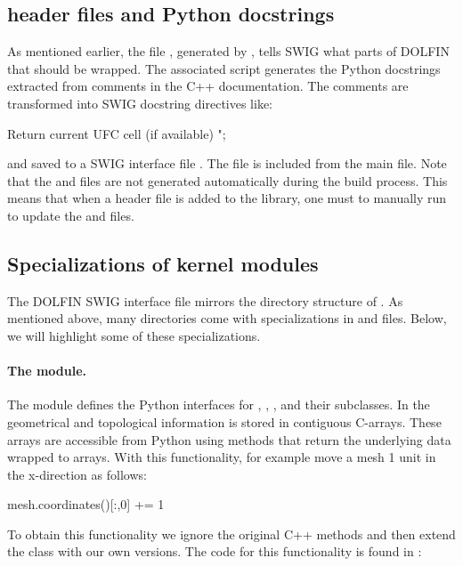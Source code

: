 \subsection{\dolfin{} header files and Python docstrings}
As mentioned earlier, the file , generated
by , tells SWIG what parts of DOLFIN that should be
wrapped.  The associated script  generates
the Python docstrings extracted from comments in the C++ documentation.
The comments are transformed into SWIG docstring directives like:
\begin{swigcode}
Return current UFC cell (if available)
";
\end{swigcode}
and saved to a SWIG interface file . The
 file is included from the main  file.
Note that the  and  files
are not generated automatically during the build process. This means
that when a header file is added to the \dolfin{} library, one must to
manually run  to update the 
and  files.


\subsection{Specializations of kernel modules}
The DOLFIN SWIG interface file  mirrors the directory
structure of \dolfin{}. As mentioned above, many directories come
with specializations in  and 
files.  Below, we will highlight some of these specializations.

\paragraph{The  module.}
The  module defines the Python interfaces for ,
, , and their subclasses. In
 the geometrical and topological information is stored in
contiguous C-arrays. These arrays are accessible from Python using
methods that return the underlying data wrapped to \numpy arrays. With
this functionality, for example move a mesh 1 unit in the
x-direction as follows:
\begin{python}
mesh.coordinates()[:,0] += 1
\end{python}
To obtain this functionality we ignore the original C++ methods and
then extend the  class with our own versions. The code for
this functionality is found in :

